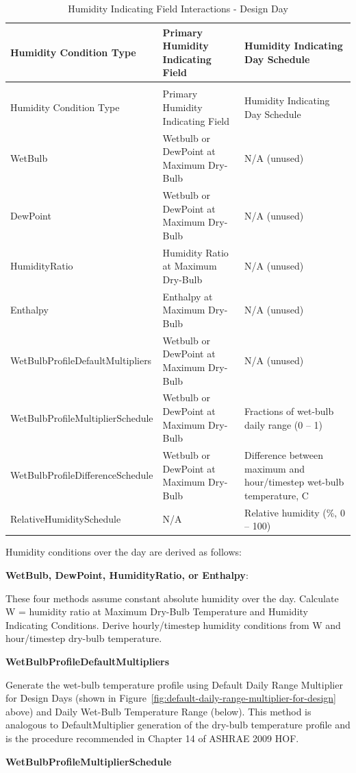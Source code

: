 \begin{longtable}[c]{p{2.25in}p{1.75in}p{2.0in}}
\caption{Humidity Indicating Field Interactions - Design Day \label{table:humidity-indicating-field-interactions-design}} \tabularnewline
\toprule
Humidity Condition Type & Primary Humidity Indicating Field & Humidity Indicating Day Schedule \tabularnewline
\midrule
\endfirsthead

\caption[]{Humidity Indicating Field Interactions - Design Day} \tabularnewline
\toprule
Humidity Condition Type & Primary Humidity Indicating Field & Humidity Indicating Day Schedule \tabularnewline
\midrule
\endhead

WetBulb & Wetbulb or DewPoint at Maximum Dry-Bulb & N/A (unused) \tabularnewline
DewPoint & Wetbulb or DewPoint at Maximum Dry-Bulb & N/A (unused) \tabularnewline
HumidityRatio & Humidity Ratio at Maximum Dry-Bulb & N/A (unused) \tabularnewline
Enthalpy & Enthalpy at Maximum Dry-Bulb & N/A (unused) \tabularnewline
WetBulbProfile\-DefaultMultipliers & Wetbulb or DewPoint at Maximum Dry-Bulb & N/A (unused) \tabularnewline
WetBulbProfile\-MultiplierSchedule & Wetbulb or DewPoint at Maximum Dry-Bulb & Fractions of wet-bulb daily range (0 – 1) \tabularnewline
WetBulbProfile\-DifferenceSchedule & Wetbulb or DewPoint at Maximum Dry-Bulb & Difference between maximum and hour/timestep wet-bulb temperature, C \tabularnewline
RelativeHumidity\-Schedule & N/A & Relative humidity (\%, 0 – 100) \tabularnewline
\bottomrule
\end{longtable}

Humidity conditions over the day are derived as follows:

\textbf{WetBulb, DewPoint, HumidityRatio, or Enthalpy}:

These four methods assume constant absolute humidity over the day. Calculate W = humidity ratio at Maximum Dry-Bulb Temperature and Humidity Indicating Conditions. Derive hourly/timestep humidity conditions from W and hour/timestep dry-bulb temperature.

\textbf{WetBulbProfileDefaultMultipliers}

Generate the wet-bulb temperature profile using Default Daily Range Multiplier for Design Days (shown in Figure~\ref{fig:default-daily-range-multiplier-for-design} above) and Daily Wet-Bulb Temperature Range (below). This method is analogous to DefaultMultiplier generation of the dry-bulb temperature profile and is the procedure recommended in Chapter 14 of ASHRAE 2009 HOF.

\textbf{WetBulbProfileMultiplierSchedule}

